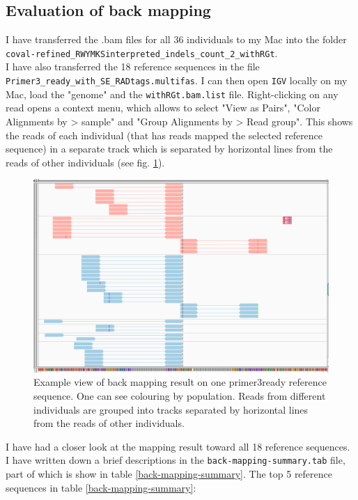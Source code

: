 \documentclass{article}\usepackage[]{graphicx}\usepackage[]{color}
\begin{document}
\subsection{Evaluation of back mapping}

I have transferred the .bam files for all 36 individuals to my Mac into the folder \\
\texttt{coval-refined\_RWYMKSinterpreted\_indels\_count\_2\_withRGt}. 
\\
I have also transferred the 18 reference sequences in the file \texttt{Primer3\_ready\_with\_SE\_RADtags.multifas}. I can then open \texttt{IGV} locally on my Mac, load the "genome" and the \texttt{withRGt.bam.list} file. Right-clicking on any read opens a context menu, which allows to select "View as Pairs", "Color Alignments by >  sample" and "Group Alignments by > Read group". This shows the reads of each individual (that has reads mapped the selected reference sequence) in a separate track which is separated by horizontal lines from the reads of other individuals (see fig. \ref{IGV-view_group-by-RG}).

\begin{figure}
\centering
\includegraphics[width=\textwidth]{./figure/IGV-view_group-by-RG}
\caption{Example view of back mapping result on one primer3ready reference sequence. One can see colouring by population. Reads from different individuals are grouped into tracks separated by horizontal lines from the reads of other individuals.}
\label{IGV-view_group-by-RG}
\end{figure}

I have had a closer look at the mapping result toward all 18 reference sequences. I have written down a brief descriptions in the \texttt{back-mapping-summary.tab} file, part of which is show in table \ref{back-mapping-summary}. The top 5 reference sequences in table \ref{back-mapping-summary}:
\end{document}
